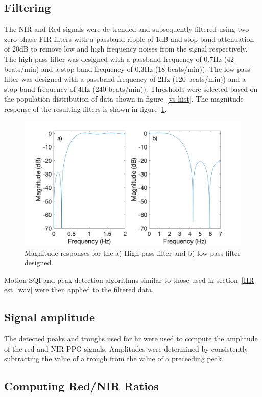 \subsection{Filtering}

The NIR and Red signals were de-trended and subsequently filtered using two zero-phase FIR filters with a passband ripple of 1dB and stop band attenuation of 20dB to remove low and high frequency noises from the signal respectively. The high-pass filter was designed with a passband frequency of  0.7Hz (42 beats/min) and a stop-band frequency of 0.3Hz (18 beats/min)). The low-pass filter was designed with a passband frequency of 2Hz (120 beats/min)) and a stop-band frequency of 4Hz (240 beats/min)). Thresholds were selected based on the population distribution of data shown in figure~\ref{vs hist}. The magnitude response of the resulting filters is shown in figure~\ref{mag_Spo2}. 

\begin{figure}
\centering
\includegraphics[width = 10 cm]{./figures/mag_responsehr.png}
    \caption[Magnitude responses.]{Magnitude responses for the a) High-pass filter and b) low-pass filter designed.}
        \label{mag_Spo2}
\end{figure}

Motion SQI and peak detection algorithms similar to those used in section~\ref{HR est_wav} were then applied to the filtered data.

\subsection{Signal amplitude}

The detected peaks and troughs used for \gls{hr} were used to compute the amplitude of the red and NIR PPG signals. Amplitudes were determined by consistently subtracting the value of a trough from the value of a preceeding peak.

\subsection{Computing Red/NIR Ratios}

